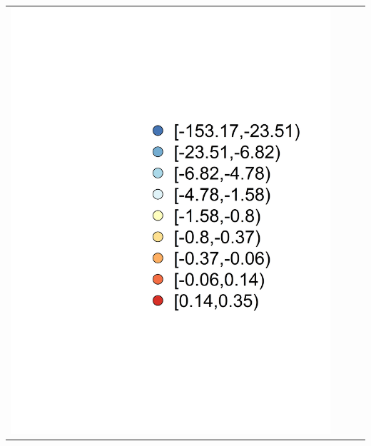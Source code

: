 \begin{landscape}
\begin{tabular}{c c c l}
					\includegraphics[trim= 5cm 2cm 0cm 3cm, clip, scale = 0.3]{./img/nashsut_legend} \\			
	\end{tabular}
\end{landscape}


		
		
		
		
